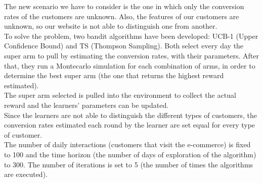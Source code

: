 The new scenario we have to consider is the one in which only the conversion rates of the customers are unknown. Also, the features of our customers are unknown, so our website is not able to distinguish one from another. \\
To solve the problem, two bandit algorithms have been developed: UCB-1 (Upper Confidence Bound) and TS (Thompson Sampling).
Both select every day the super arm to pull by estimating the conversion rates, with their parameters. After that, they run a Montecarlo simulation for each combination of arms, in order to determine the best super arm (the one that returns the highest reward estimated).\\
The super arm selected is pulled into the environment to collect the actual reward and the learners' parameters can be updated.\\
Since the learners are not able to distinguish the different types of customers, the conversion rates estimated each round by the learner are set equal for every type of customer.\\
The number of daily interactions (customers that visit the e-commerce) is fixed to 100 and the time horizon (the number of days of exploration of the algorithm) to 300. The number of iterations is set to 5 (the number of times the algorithms are executed).

